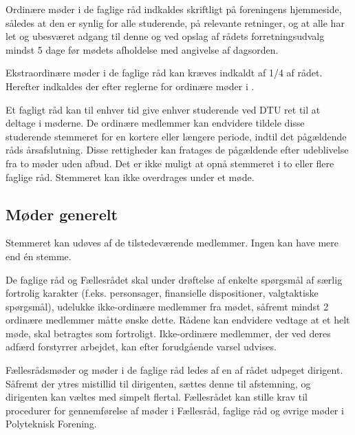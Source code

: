\begin{list}
\item  \label{S:FagligMoeder:indkaldelse} Ordinære møder i de faglige råd indkaldes skriftligt på foreningens hjemmeside, således at den er synlig for alle studerende, på relevante retninger, og at alle har let og ubesværet adgang til denne og ved opslag af rådets forretningsudvalg mindst 5 dage før mødets afholdelse med angivelse af dagsorden. 

\item  Ekstraordinære møder i de faglige råd kan kræves indkaldt af 1/4 af rådet. Herefter indkaldes der efter reglerne for ordinære møder i .

\item  Et fagligt råd kan til enhver tid give enhver studerende ved DTU ret til at deltage i møderne. De ordinære medlemmer kan endvidere tildele disse studerende stemmeret for en kortere eller længere periode, indtil det pågældende råds årsafslutning. Disse rettigheder kan fratages de pågældende efter udeblivelse fra to møder uden afbud. Det er ikke muligt at opnå stemmeret i to eller flere faglige råd. Stemmeret kan ikke overdrages under et møde.


\subsection{Møder generelt}
\label{S:kap:MoederGenerelt}
\item  Stemmeret kan udøves af de tilstedeværende medlemmer. Ingen kan have mere end én stemme.

\item \label{S:MoederGenerelt:fortrolig} De faglige råd og Fællesrådet skal under drøftelse af enkelte spørgsmål af særlig fortrolig karakter (f.eks. personsager, finansielle dispositioner, valgtaktiske spørgsmål), udelukke ikke-ordinære medlemmer fra mødet, såfremt mindst 2 ordinære medlemmer måtte ønske dette. Rådene kan endvidere vedtage at et helt møde, skal betragtes som fortroligt. Ikke-ordinære medlemmer, der ved deres adfærd forstyrrer arbejdet, kan efter forudgående varsel udvises.

\item  Fællesrådsmøder og møder i de faglige råd ledes af en af rådet udpeget dirigent. Såfremt der ytres mistillid til dirigenten, sættes denne til afstemning, og dirigenten kan væltes med simpelt flertal. Fællesrådet kan stille krav til procedurer for gennemførelse af møder i Fællesråd, faglige råd og øvrige møder i Polyteknisk Forening.


\end{list}
